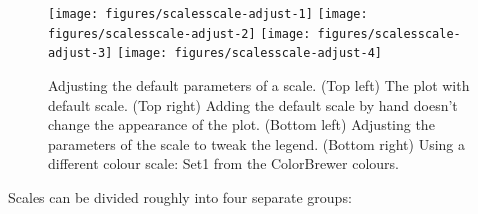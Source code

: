 \begin{Shaded}
\begin{Highlighting}[]
\StringTok{ }  
\StringTok{ }\NormalTok{()}

\StringTok{ }\NormalTok{(}\NormalTok{, }
    \NormalTok{(}\NormalTok{, }\NormalTok{, }\NormalTok{, }\NormalTok{), }
    \NormalTok{(}\NormalTok{, }\NormalTok{, }\NormalTok{, }\NormalTok{))}

\StringTok{ }\NormalTok{(} \NormalTok{)}
\end{Highlighting}
\end{Shaded}

\begin{figure}
\texttt{[image: figures/scalesscale-adjust-1]} \texttt{[image: figures/scalesscale-adjust-2]} \texttt{[image: figures/scalesscale-adjust-3]} \texttt{[image: figures/scalesscale-adjust-4]} \caption{Adjusting the default parameters of a scale. (Top left) The plot with default scale. (Top right) Adding the default scale by hand doesn't change the appearance of the plot. (Bottom left) Adjusting the parameters of the scale to tweak the legend. (Bottom right) Using a different colour scale: Set1 from the ColorBrewer colours.\label{fig:scale-adjust}}
\end{figure}


Scales can be divided roughly into four separate groups:

